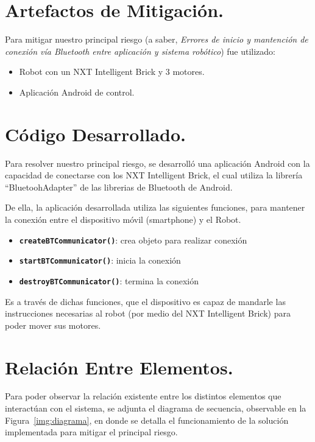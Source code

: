 \documentclass[letterpaper,12pt]{article} %
\numberwithin{equation}{section} %
\numberwithin{figure}{section} %
\numberwithin{table}{section} %
\begin{document}
\setcounter{page}{1} %


\section{Artefactos de Mitigaci\'on.}
Para mitigar nuestro principal riesgo (a saber, \emph{Errores de inicio y mantenci\'on de conexi\'on v\'ia Bluetooth entre aplicaci\'on y sistema rob\'otico}) fue utilizado:

\begin{itemize}
\item Robot con un NXT Intelligent Brick y 3 motores.
\item Aplicaci\'on Android de control.
\end{itemize}

\section{C\'odigo Desarrollado.}
Para resolver nuestro principal riesgo, se desarroll\'o una aplicaci\'on Android con la capacidad de conectarse con los NXT Intelligent Brick, el cual utiliza la librer\'ia ``BluetoohAdapter'' de las librerias de Bluetooth de Android.

De ella, la aplicaci\'on desarrollada utiliza las siguientes funciones, para mantener la conexi\'on entre el dispositivo m\'ovil (smartphone) y el Robot.

\begin{itemize}
\item {\bf \verb+createBTCommunicator()+}: crea objeto para realizar conexi\'on
\item {\bf \verb+startBTCommunicator()+}: inicia la conexi\'on
\item {\bf \verb+destroyBTCommunicator()+}: termina la conexi\'on
\end{itemize}

Es a trav\'es de dichas funciones, que el dispositivo es capaz de mandarle las instrucciones necesarias al robot (por medio del NXT Intelligent Brick) para poder mover sus motores.

\section{Relaci\'on Entre Elementos.} %
Para poder observar la relaci\'on existente entre los distintos elementos que interact\'uan con el sistema, se adjunta el diagrama de secuencia, observable en la Figura~\ref{img:diagrama}, en donde se detalla el funcionamiento de la soluci\'on implementada para mitigar el principal riesgo.
\end{document}
